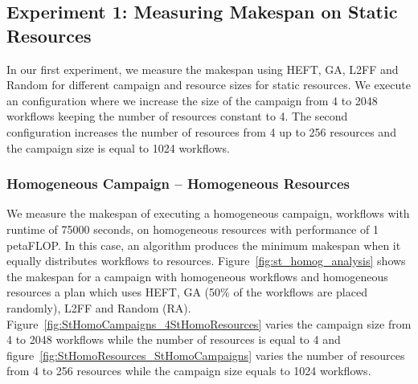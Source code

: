 \subsection{Experiment 1: Measuring Makespan on Static Resources}

In our first experiment, we measure the makespan using HEFT, GA, L2FF and Random for different campaign and resource sizes for static resources.
We execute an configuration where we increase the size of the campaign from 4 to 2048 workflows keeping the number of resources constant to 4.
The second configuration increases the number of resources from 4 up to 256 resources and the campaign size is equal to 1024 workflows.

\subsubsection*{Homogeneous Campaign -- Homogeneous Resources}

We measure the makespan of executing a homogeneous campaign, workflows with runtime of 75000 seconds, on homogeneous resources with performance of 1 petaFLOP.
In this case, an algorithm produces the minimum makespan when it equally distributes workflows to resources.
Figure~\ref{fig:st_homog_analysis} shows the makespan for a campaign with homogeneous workflows and homogeneous resources a plan which uses HEFT, GA (50\% of the workflows are placed randomly), L2FF and Random (RA).
Figure~\ref{fig:StHomoCampaigns_4StHomoResources} varies the campaign size from 4 to 2048 workflows while the number of resources is equal to 4 and figure~\ref{fig:StHomoResources_StHomoCampaigns} varies the number of resources from 4 to 256 resources while the campaign size equals to 1024 workflows.

